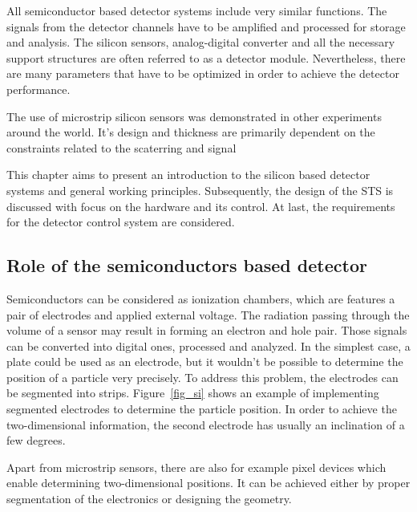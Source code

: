 
All semiconductor based detector systems include very similar functions. The signals from the detector channels have to be amplified and processed for storage and analysis. The silicon sensors, analog-digital converter and all the necessary support structures are often referred to as a detector module. Nevertheless, there are many parameters that have to be optimized in order to achieve the detector performance.

The use of microstrip silicon sensors was demonstrated in other experiments around the world. It's design and thickness are primarily dependent on the constraints related to the scaterring and signal

This chapter aims to present an introduction to the silicon based detector systems and general working principles. Subsequently, the design of the \gls{STS} is discussed with focus on the hardware and its control. At last, the requirements for the detector control system are considered. 

\subsection{Role of the semiconductors based detector}

Semiconductors can be considered as ionization chambers, which are features a pair of electrodes and applied external voltage. The radiation passing through the volume of a sensor may result in forming an electron and hole pair. Those signals can be converted into digital ones, processed and analyzed.
In the simplest case, a plate could be used as an electrode, but it wouldn't be possible to determine the position of a particle very precisely. To address this problem, the electrodes can be segmented into strips. Figure~\ref{fig_si} shows an example of implementing segmented electrodes to determine the particle position. In order to achieve the two-dimensional information, the second electrode has usually an inclination of a few degrees.

Apart from microstrip sensors, there are also for example pixel devices which enable determining two-dimensional positions. It can be achieved either by proper segmentation of the electronics or designing the geometry.  

